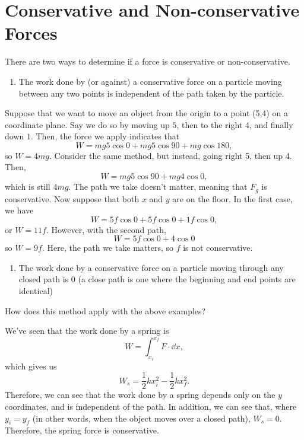 \documentclass[11pt]{article}
\begin{document}
\section{Conservative and Non-conservative Forces}
There are two ways to determine if a force is conservative or non-conservative.
\begin{enumerate}
	\item The work done by (or against) a conservative force on a particle moving between any two points is independent of the path taken by the particle.
\end{enumerate}
Suppose that we want to move an object from the origin to a point (5,4) on a coordinate plane. Say we do so by moving up $5$, then to the right $4$, and finally down $1$. Then, the force we apply indicates that
\[W = mg5\cos0+mg5\cos90+mg\cos180,\]
so $W = 4mg$. Consider the same method, but instead, going right 5, then up 4. Then,
\[W = mg5\cos90 + mg4\cos0,\]
which is still $4mg$. The path we take doesn't matter, meaning that $F_g$ is conservative. Now suppose that both $x$ and $y$ are on the floor. In the first case, we have
\[W = 5f\cos0 + 5f\cos0 + 1f\cos 0,\]
or $W = 11f$. However, with the second path,
\[W = 5f\cos0 + 4\cos0\]
so $W = 9f$. Here, the path we take matters, so $f$ is not conservative.
\begin{enumerate}[resume]
	\item The work done by a conservative force on a particle moving through any closed path is 0 (a close path is one where the beginning and end points are identical)
\end{enumerate}
\begin{question}
	How does this method apply with the above examples?
\end{question}
We've seen that the work done by a spring is
\[W = \int_{x_i}^{x_f} F \cdot \dd x,\]
which gives us
\[W_s = \frac{1}{2}kx_i^2 - \frac{1}{2}kx_f^2.\]
Therefore, we can see that the work done by a spring depends only on the $y$ coordinates, and is independent of the path. In addition, we can see that, where $y_i = y_f$ (in other words, when the object moves over a closed path), $W_s = 0$. Therefore, the spring force is conservative.
\end{document}
